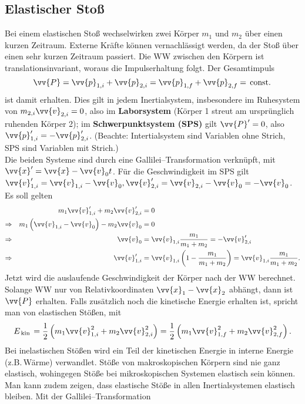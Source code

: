 \documentclass[a4paper,12pt]{article}
\numberwithin{equation}{section}
\begin{document}
\subsection{Elastischer Stoß}
Bei einem elastischen Stoß wechselwirken zwei Körper $m_1$ und $m_2$ über einen kurzen Zeitraum. Externe Kräfte können vernachlässigt werden, da der Stoß über einen sehr kurzen Zeitraum passiert. Die WW zwischen den Körpern ist translationsinvariant, woraus die Impulserhaltung folgt. Der Gesamtimpuls 
\[ 
        \vv{P}=\vv{p}_{1,i}+\vv{p}_{2,i}=\vv{p}_{1,f}+\vv{p}_{2,f}=\,\text{const.}\,
\] 
ist damit erhalten. Dies gilt in jedem Inertialsystem, insbesondere im Ruhesystem von $m_{2,i}\vv{v}_{2,i}=0$, also im \textbf{Laborsystem} (Körper 1 streut am ursprünglich ruhenden Körper 2); im \textbf{Schwerpunktsystem (SPS)} gilt $\vv{P}'=0$, also $\vv{p}_{1,i}'=-\vv{p}_{2,i}'$. (Beachte: Intertialsystem sind Variablen ohne Strich, SPS sind Variablen mit Strich.)\\\indent
Die beiden Systeme sind durch eine Gallilei--Transformation verknüpft, mit $\vv{x}'=\vv{x}-\vv{v}_0t$. Für die Geschwindigkeit im SPS gilt $\vv{v}_{1,i}'=\vv{v}_{1,i}-\vv{v}_0,\vv{v}_{2,i}'=\vv{v}_{2,i}-\vv{v}_0=-\vv{v}_0$.\\\indent
Es soll gelten
\begin{align*}
        && m_1\vv{v}_{1,i}'+m_2\vv{v}_{2,i}'&=0\\
        \Rightarrow && m_1\left(\vv{v}_{1,i}-\vv{v}_0\right)-m_2\vv{v}_0&=0\\
        \Rightarrow &&\vv{v}_0&=\vv{v}_{1,i}\dfrac{m_1}{m_1+m_2}=-\vv{v}_{2,i}'\\
        \Rightarrow &&\vv{v}_{1,i}'&=\vv{v}_{1,i}\left(1-\dfrac{m_1}{m_1+m_2}\right)=\vv{v}_{1,i}\dfrac{m_1}{m_1+m_2}
.\end{align*}
Jetzt wird die auslaufende Geschwindigkeit der Körper nach der WW berechnet. Solange WW nur von Relativkoordinaten $\vv{x}_1-\vv{x}_2$ abhängt, dann ist $\vv{P}$ erhalten. Falls zusätzlich noch die kinetische Energie erhalten ist, spricht man von elastischen Stößen, mit 
\[ 
        E_{\,\text{kin}\,}=\dfrac{1}{2}\left(m_1\vv{v}_{1,i}^2+m_2\vv{v}_{2,i}^2\right)=\dfrac{1}{2}\left(m_1\vv{v}_{1,f}^2+m_2\vv{v}_{2,f}^2\right)
.\] 
Bei inelastischen Stößen wird ein Teil der kinetischen Energie in \glqq interne\grqq{} Energie (z.B.\,Wärme) verwandlet. Stöße von makroskopischen Körpern sind nie ganz elastisch, wohingegen Stöße bei mikroskopischen Systemen elastisch sein können. Man kann zudem zeigen, dass elastische Stöße in allen Inertialsystemen elastisch bleiben. Mit der Gallilei--Transformation
\end{document}
